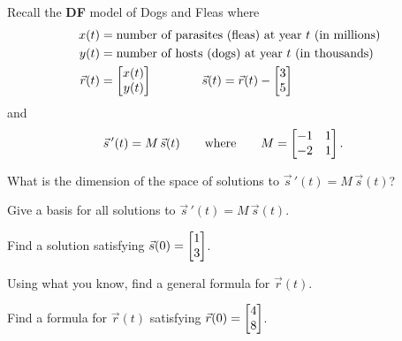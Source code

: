 \documentclass{workbook}
\begin{document}
\begin{slide}
	\question
 		Recall the \textbf{DF} model of Dogs and Fleas where 
	\begin{align*}
		x(t) &= \text{number of parasites (fleas) at year $t$ (in millions)}\\
		y(t) &= \text{number of hosts (dogs) at year $t$ (in thousands)}\\
		\vec r(t) &= \mat{x(t)\\y(t)} \qquad\qquad
		\vec s(t) = \vec r(t) - \mat{3\\5}
	\end{align*}
	and
	\begin{align*}
		\vec s\,'(t) &= M\,\vec s(t)\qquad\text{where}\qquad M=\mat{-1&1\\-2&1}.
	\end{align*}
	
	\begin{parts}
		\item What is the dimension of the space of solutions to $\vec s\,'(t) = M\,\vec s(t)$?
		\item Give a basis for all solutions to $\vec s\,'(t) = M\,\vec s(t)$.
		\item Find a solution satisfying $\vec s(0)=\mat{1\\3}$.
		\bigskip 
		\item Using what you know, find a general formula for $\vec r(t)$.
		\item Find a formula for $\vec r(t)$ satisfying $\vec r(0)=\mat{4\\8}$.
	\end{parts}
\end{slide}

%
%
\end{document}
